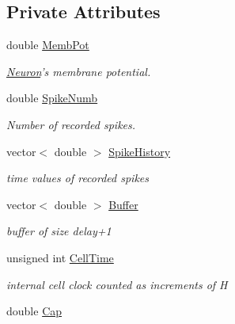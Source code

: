 \subsection*{Private Attributes}
\begin{DoxyCompactItemize}
\item 
\hypertarget{classNeuron_a0cc904963df08f74819024fd29dcbec9}{double \hyperlink{classNeuron_a0cc904963df08f74819024fd29dcbec9}{Memb\-Pot}}\label{classNeuron_a0cc904963df08f74819024fd29dcbec9}

\begin{DoxyCompactList}\small\item\em \hyperlink{classNeuron}{Neuron}'s membrane potential. \end{DoxyCompactList}\item 
\hypertarget{classNeuron_a18a9a9de79010fe29b4a6ac36b98c042}{double \hyperlink{classNeuron_a18a9a9de79010fe29b4a6ac36b98c042}{Spike\-Numb}}\label{classNeuron_a18a9a9de79010fe29b4a6ac36b98c042}

\begin{DoxyCompactList}\small\item\em Number of recorded spikes. \end{DoxyCompactList}\item 
\hypertarget{classNeuron_a5390598674c0914c1b33ccd965ae8614}{vector$<$ double $>$ \hyperlink{classNeuron_a5390598674c0914c1b33ccd965ae8614}{Spike\-History}}\label{classNeuron_a5390598674c0914c1b33ccd965ae8614}

\begin{DoxyCompactList}\small\item\em time values of recorded spikes \end{DoxyCompactList}\item 
\hypertarget{classNeuron_af543fffab27b7170f22d17b82b1bd2a8}{vector$<$ double $>$ \hyperlink{classNeuron_af543fffab27b7170f22d17b82b1bd2a8}{Buffer}}\label{classNeuron_af543fffab27b7170f22d17b82b1bd2a8}

\begin{DoxyCompactList}\small\item\em buffer of size delay+1 \end{DoxyCompactList}\item 
\hypertarget{classNeuron_a1644aba0fa4556c1e7d9be40609af5c2}{unsigned int \hyperlink{classNeuron_a1644aba0fa4556c1e7d9be40609af5c2}{Cell\-Time}}\label{classNeuron_a1644aba0fa4556c1e7d9be40609af5c2}

\begin{DoxyCompactList}\small\item\em internal cell clock counted as increments of H \end{DoxyCompactList}\item 
\hypertarget{classNeuron_a4e5eb31bf0153ca9f1a599f1183988e2}{double \hyperlink{classNeuron_a4e5eb31bf0153ca9f1a599f1183988e2}{Cap}}\label{classNeuron_a4e5eb31bf0153ca9f1a599f1183988e2}


\end{DoxyCompactItemize}
